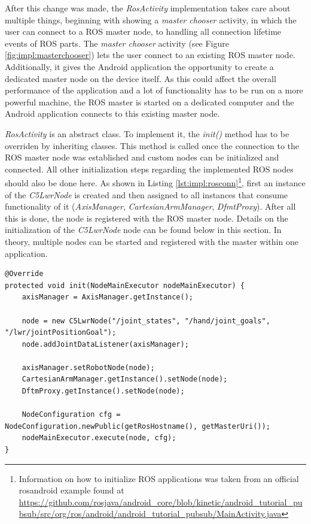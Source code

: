 After this change was made, the \textit{RosActivity} implementation takes care about multiple things, beginning with showing a \textit{master chooser}  activity, in which the user can connect to a ROS master node, to handling all connection lifetime events of ROS parts. The \textit{master chooser} activity (see Figure \ref{fig:impl:masterchooser}) lets the user connect to an existing ROS master node. Additionally, it gives the Android application the opportunity to create a dedicated master node on the device itself. As this could affect the overall performance of the application and a lot of functionality has to be run on a more powerful machine, the ROS master is started on a dedicated computer and the Android application connects to this existing master node.

\textit{RosActivity} is an abstract class. To implement it, the \textit{init()} method has to be overriden by inheriting classes. This method is called once the connection to the ROS master node was established and custom nodes can be initialized and connected. All other initialization steps regarding the implemented ROS nodes should also be done here. As shown in Listing \ref{lst:impl:rosconn}\footnote{Information on how to initialize ROS applications was taken from an official rosandroid example found at \url{https://github.com/rosjava/android_core/blob/kinetic/android_tutorial_pubsub/src/org/ros/android/android_tutorial_pubsub/MainActivity.java}}, first an instance of the \textit{C5LwrNode} is created and then assigned to all instances that consume functionality of it (\textit{AxisManager}, \textit{CartesianArmManager}, \textit{DfmtProxy}). After all this is done, the node is registered with the ROS master node. Details on the initialization of the \textit{C5LwrNode} node can be found below in this section. In theory, multiple nodes can be started and registered with the master within one application.

\begin{lstlisting}[caption={Initialization of the ROS connection}, label={lst:impl:rosconn}]
@Override
protected void init(NodeMainExecutor nodeMainExecutor) {
	axisManager = AxisManager.getInstance();
	
	node = new C5LwrNode("/joint_states", "/hand/joint_goals", "/lwr/jointPositionGoal");
	node.addJointDataListener(axisManager);
	
	axisManager.setRobotNode(node);
	CartesianArmManager.getInstance().setNode(node);
	DftmProxy.getInstance().setNode(node);

	NodeConfiguration cfg = NodeConfiguration.newPublic(getRosHostname(), getMasterUri());
	nodeMainExecutor.execute(node, cfg);
}
\end{lstlisting}

